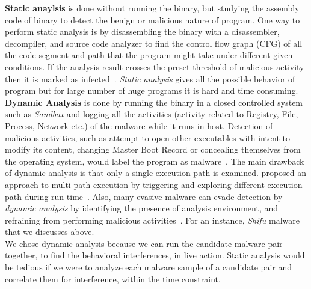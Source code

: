 \textbf{Static anaylsis} is done without running the binary, but studying the assembly code of binary to detect the benign or malicious nature of program.
One way to perform static analysis is by disassembling the binary with a disassembler, decompiler, and source code analyzer to find the control flow graph (CFG) of all the code segment and path that the program might take under different given conditions.
If the analysis result crosses the preset threshold of malicious activity then it is marked as infected~\cite[]{sharma2014}.
\emph{Static analysis} gives all the possible behavior of program but for large number of huge programs it is hard and time consuming.\\

\textbf{Dynamic Analysis} is done by running the binary in a closed controlled system such as \emph{Sandbox} and logging all the activities (activity related to Registry, File, Process, Network etc.) of the malware while it runs in host.
Detection of malicious activities, such as attempt to open other executables with intent to modify its content, changing Master Boot Record or concealing themselves from the operating system, would label the program as malware~\cite[]{sharma2014}.
The main drawback of dynamic analysis is that only a single execution path is examined.
\citeauthor{chipounov2012s2e} proposed an approach to multi-path execution by triggering and exploring different execution path during run-time~\cite[]{chipounov2012s2e}.
Also, many evasive malware can evade detection by \emph{dynamic analysis} by identifying the presence of analysis environment, and refraining from performing malicious activities~\cite[]{barecloud}.
For an instance, \emph{Shifu} malware that we discusses above.
\\

We chose dynamic analysis because we can run the candidate malware pair together, to find the behavioral interferences, in live action.
Static analysis would be tedious if we were to analyze each malware sample of a candidate pair and correlate them for interference, within the time constraint.
